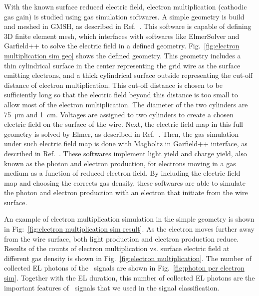 With the known surface reduced electric field, electron multiplication (cathodic gas gain) is studied using gas simulation softwares. A simple geometry is build and meshed in GMSH, as described in Ref.~\cite{Geuzaine2009}.  This software is capable of defining 3D finite element mesh, which interfaces with softwares like ElmerSolver and Garfield++ to solve the electric field in a defined geometry. Fig.~\ref{fig:electron multiplication sim geo} shows the defined geometry. This geometry includes a thin cylindrical surface in the center representing the grid wire as the surface emitting electrons, and a thick cylindrical surface outside representing the cut-off distance of electron multiplication. This cut-off distance is chosen to be sufficiently long so that the electric field beyond this distance is too small to allow most of the electron multiplication. The diameter of the two cylinders are \SI{75}{\um} and \SI{1}{\cm}. Voltages are assigned to two cylinders to create a chosen electric field on the surface of the wire. Next, the electric field map in this full geometry is solved by Elmer, as described in Ref.~\cite{Elmergrid2000, Kotila1999}.  Then, the gas simulation under such electric field map is done with Magboltz in Garfield++ interface, as described in Ref.~\cite{Biagi1999, Veenhof1998}. These softwares implement light yield and charge yield, also known as the photon and electron production, for electrons moving in a gas medium as a function of reduced electron field. By including the electric field map and choosing the corrects gas density, these softwares are able to simulate the photon and electron production with an electron that initiate from the wire surface. 

An example of electron multiplication simulation in the simple geometry is shown in Fig:~\ref{fig:electron multiplication sim result}. As the electron moves further away from the wire surface, both light production and electron production reduce. Results of the counts of electron multiplication vs. surface electric field at different gas density is shown in Fig.~\ref{fig:electron multiplication}. The number of collected EL photons of the \ees\ signals are shown in Fig.~\ref{fig:photon per electron sim}. Together with the EL duration, this number of collected EL photons are the important features of \ees\ signals that we used in the signal classification.

